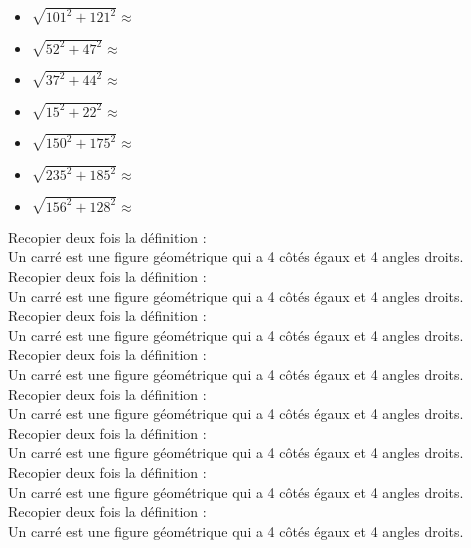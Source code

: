 \begin{multicols}{3}
\begin{itemize}[label={$\bullet$}]
  \item $\sqrt{101^2 + 121^2} \approx $ \dotfill \\
  \item $\sqrt{52^2 + 47^2} \approx $ \dotfill \\
  \item $\sqrt{37^2 + 44^2} \approx $ \dotfill \\
  \item $\sqrt{15^2 + 22^2} \approx $ \dotfill \\
  \item $\sqrt{150^2 + 175^2} \approx $ \dotfill \\
  \item $\sqrt{235^2 + 185^2} \approx $ \dotfill \\
  \item $\sqrt{156^2 + 128^2} \approx $ \dotfill \\ 
\end{itemize}

\end{multicols}

Recopier deux fois la définition : \\ Un carré est une figure géométrique qui a 4 côtés égaux et 4 angles droits. \\

Recopier deux fois la définition : \\  Un carré est une figure géométrique qui a 4 côtés égaux et 4 angles droits. \\

Recopier deux fois la définition : \\  Un carré est une figure géométrique qui a 4 côtés égaux et 4 angles droits. \\

Recopier deux fois la définition : \\  Un carré est une figure géométrique qui a 4 côtés égaux et 4 angles droits. \\

Recopier deux fois la définition : \\  Un carré est une figure géométrique qui a 4 côtés égaux et 4 angles droits. \\

Recopier deux fois la définition : \\  Un carré est une figure géométrique qui a 4 côtés égaux et 4 angles droits. \\

Recopier deux fois la définition : \\  Un carré est une figure géométrique qui a 4 côtés égaux et 4 angles droits. \\

Recopier deux fois la définition : \\  Un carré est une figure géométrique qui a 4 côtés égaux et 4 angles droits. \\


